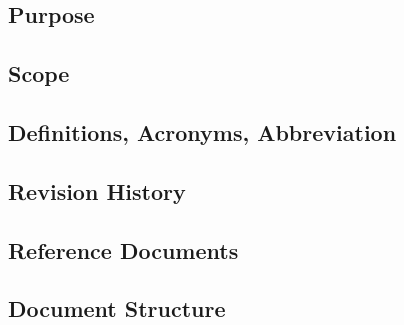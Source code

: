 \subsection{Purpose}

\subsection{Scope}

\subsection{Definitions, Acronyms, Abbreviation}

\subsection{Revision History}

\subsection{Reference Documents}

\subsection{Document Structure}

